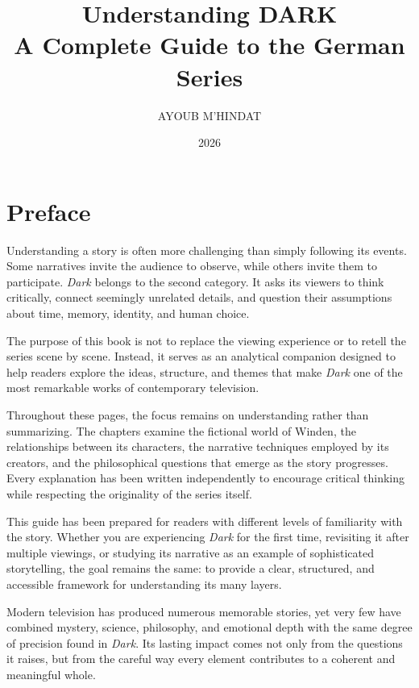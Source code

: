 \documentclass[12pt,oneside,openany]{book}
\title{\Huge Understanding DARK\\[0.5cm]
\Large A Complete Guide to the German Series}
\author{AYOUB M'HINDAT}
\date{2026}
\begin{document}

\frontmatter

\maketitle
\thispagestyle{empty}

\chapter*{Preface}

Understanding a story is often more challenging than simply following its
events. Some narratives invite the audience to observe, while others invite
them to participate. \textit{Dark} belongs to the second category. It asks
its viewers to think critically, connect seemingly unrelated details, and
question their assumptions about time, memory, identity, and human choice.

The purpose of this book is not to replace the viewing experience or to
retell the series scene by scene. Instead, it serves as an analytical
companion designed to help readers explore the ideas, structure, and themes
that make \textit{Dark} one of the most remarkable works of contemporary
television.

Throughout these pages, the focus remains on understanding rather than
summarizing. The chapters examine the fictional world of Winden, the
relationships between its characters, the narrative techniques employed by
its creators, and the philosophical questions that emerge as the story
progresses. Every explanation has been written independently to encourage
critical thinking while respecting the originality of the series itself.

This guide has been prepared for readers with different levels of familiarity
with the story. Whether you are experiencing \textit{Dark} for the first
time, revisiting it after multiple viewings, or studying its narrative as an
example of sophisticated storytelling, the goal remains the same: to provide
a clear, structured, and accessible framework for understanding its many
layers.

Modern television has produced numerous memorable stories, yet very few have
combined mystery, science, philosophy, and emotional depth with the same
degree of precision found in \textit{Dark}. Its lasting impact comes not only
from the questions it raises, but from the careful way every element
contributes to a coherent and meaningful whole.
\end{document}
